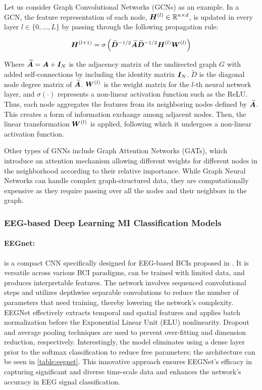 Let us consider Graph Convolutional Networks (GCNs) as an example. In a GCN, the feature representation of each node, $\bm {H}^{(l)} \in \mathbb{R}^{n \times d}$, is updated in every layer $l \in \{0, \ldots, L\}$ by passing through the following propagation rule:

\begin{equation}
\bm {H}^{(l+1)} = \sigma\left(\widetilde{\bm {D}}^{-1/2}\widetilde{\bm {A}}\widetilde{\bm {D}}^{-1/2} \bm {H}^{(l)}\bm {W}^{(l)}\right)
\end{equation}

Where $\widetilde{\bm {A}} = \bm {A} + \bm {I}_N $ is the adjacency matrix of the undirected graph $G$ with added self-connections by including the identity matrix $\bm {I}_N$. $\widetilde{D}$ is the diagonal node degree matrix of $\widetilde{\bm {A}}$. $\bm {W}^{(l)}$ is the weight matrix for the $l$-th neural network layer, and $\sigma(\cdot)$ represents a non-linear activation function such as the ReLU. Thus, each node aggregates the features from its neighboring nodes defined by $\widetilde{\bm {A}}$. This creates a form of information exchange among adjacent nodes. Then, the linear transformation $\bm {W}^{(l)}$ is applied, following which it undergoes a non-linear activation function.

Other types of GNNs include Graph Attention Networks (GATs), which introduce an attention mechanism allowing different weights for different nodes in the neighborhood according to their relative importance. While Graph Neural Networks can handle complex graph-structured data, they are computationally expensive as they require passing over all the nodes and their neighbors in the graph.

\subsubsection{EEG-based Deep Learning MI Classification Models}

\paragraph{EEGnet:} is a compact CNN specifically designed for EEG-based BCIs proposed in \cite{lawhern2018eegnet}. It is versatile across various BCI paradigms, can be trained with limited data, and produces interpretable features. The network involves sequenced convolutional steps and utilizes depthwise separable convolutions to reduce the number of parameters that need training, thereby lowering the network's complexity. EEGNet effectively extracts temporal and spatial features and applies batch normalization before the Exponential Linear Unit (ELU) nonlinearity. Dropout and average pooling techniques are used to prevent over-fitting and dimension reduction, respectively. Interestingly, the model eliminates using a dense layer prior to the softmax classification to reduce free parameters; the architecture can be seen in \cref{table:eegnet}. This innovative approach ensures EEGNet's efficacy in capturing significant and diverse time-scale data and enhances the network's accuracy in EEG signal classification.

